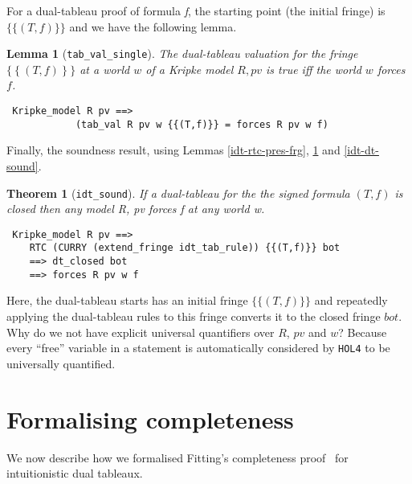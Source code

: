 \documentclass[a4paper]{article}
\newtheorem{theorem}{Theorem}
\newtheorem{lemma}{Lemma}
\newcommand{\hol}{\texttt{HOL4}}
\begin{document}
For a dual-tableau proof of formula \textit{f},
the starting point (the initial fringe) is $\{\{(T,f)\}\}$ and 
we have the following lemma.
\begin{lemma}[\texttt{tab\_val\_single}] \label{tab-val-single}
%
The dual-tableau valuation for the fringe $\{ ~\{~ (T, f)~ \}~ \}$ at
a world $w$ of a Kripke model $R, pv$ is
true iff the world $w$ forces $f$.
\end{lemma}
\begin{verbatim}
 Kripke_model R pv ==> 
            (tab_val R pv w {{(T,f)}} = forces R pv w f)
\end{verbatim}

Finally, the soundness result, using 
Lemmas \ref{idt-rtc-pres-frg}, \ref{tab-val-single} and \ref{idt-dt-sound}.

\begin{theorem}[\texttt{idt\_sound}] \label{idt-sound}
If a dual-tableau for the the signed formula $(T,f)$ is closed
then any model \textit{R, pv} forces \textit{f} at any world
\textit{w}.
\begin{verbatim}
 Kripke_model R pv ==>
    RTC (CURRY (extend_fringe idt_tab_rule)) {{(T,f)}} bot 
    ==> dt_closed bot 
    ==> forces R pv w f
\end{verbatim}
\end{theorem}

Here, the dual-tableau starts has an  initial
fringe $\{\{(T,f)\}\}$ and repeatedly applying the dual-tableau rules
to this fringe converts it to the closed fringe $bot$.
Why do we not have explicit universal quantifiers over $R$, $pv$ and
$w$? Because every ``free'' variable in a statement is automatically
considered by \hol{} to be universally quantified.

\section{Formalising completeness} %

We now describe how we formalised Fitting's completeness
proof~\cite[Section~1.3.3]{fitting-dual-tableau} for intuitionistic
dual tableaux.
\end{document}
